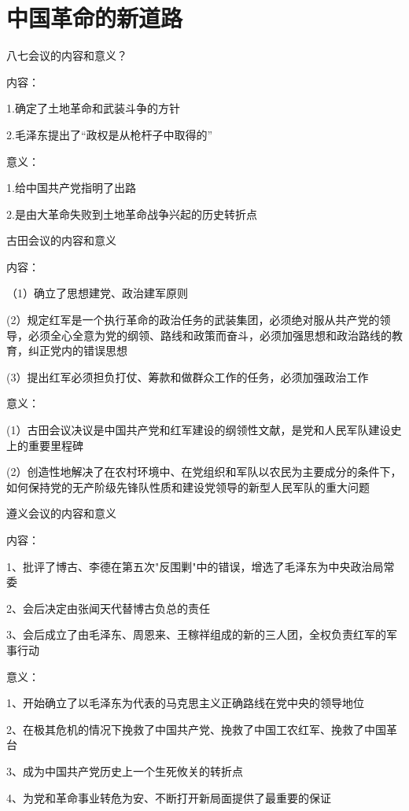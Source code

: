 \documentclass[lang=cn,10pt]{elegantbook}
\begin{document}
	\chapter{中国革命的新道路}
	\begin{example}
		八七会议的内容和意义？
	\end{example}
	\begin{solution}
		内容：
		
		1.确定了土地革命和武装斗争的方针
		
	 	2.毛泽东提出了“政权是从枪杆子中取得的”
	 	
	 	意义：
	 	
	 	1.给中国共产党指明了出路
	 	
	 	2.是由大革命失败到土地革命战争兴起的历史转折点
	\end{solution}
	\begin{example}
		古田会议的内容和意义
	\end{example}
	\begin{solution}
		
		内容：
		
		（1）确立了思想建党、政治建军原则
		
		(2）规定红军是一个执行革命的政治任务的武装集团，必须绝对服从共产党的领导，必须全心全意为党的纲领、路线和政策而奋斗，必须加强思想和政治路线的教育，纠正党内的错误思想
		
		(3）提出红军必须担负打仗、筹款和做群众工作的任务，必须加强政治工作
		
		意义：
		
		(1）古田会议决议是中国共产党和红军建设的纲领性文献，是党和人民军队建设史上的重要里程碑
		
		(2）创造性地解决了在农村环境中、在党组织和军队以农民为主要成分的条件下，如何保持党的无产阶级先锋队性质和建设党领导的新型人民军队的重大问题
	\end{solution}
	\begin{example}
		遵义会议的内容和意义
	\end{example}
	\begin{solution}
		
		内容：
		
		1、批评了博古、李德在第五次"反围剿"中的错误，增选了毛泽东为中央政治局常委
		
		2、会后决定由张闻天代替博古负总的责任
		
		3、会后成立了由毛泽东、周恩来、王稼祥组成的新的三人团，全权负责红军的军事行动
		
		意义：
		
		1、开始确立了以毛泽东为代表的马克思主义正确路线在党中央的领导地位
		
		2、在极其危机的情况下挽救了中国共产党、挽救了中国工农红军、挽救了中国革台
		
		3、成为中国共产党历史上一个生死攸关的转折点
		
		4、为党和革命事业转危为安、不断打开新局面提供了最重要的保证
	\end{solution}
\end{document}
